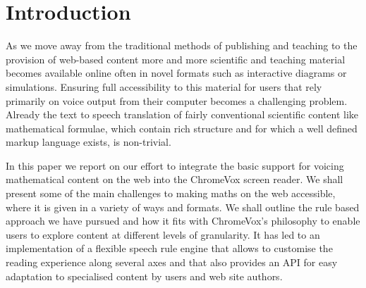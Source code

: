 \documentclass{sig-alternate}
\begin{document}
\terms{}

\keywords{}

\section{Introduction}\label{sec:intro}
As we move away from the traditional methods of publishing and
teaching to the provision of web-based content more and more
scientific and teaching material becomes available online often in
novel formats such as interactive diagrams or simulations. Ensuring
full accessibility to this material for users that rely primarily on
voice output from their computer becomes a challenging
problem. Already the text to speech translation of fairly conventional
scientific content like mathematical formulae, which contain rich
structure and for which a well defined markup language exists, is
non-trivial.


In this paper we report on our effort to integrate the basic support
for voicing mathematical content on the web into the ChromeVox screen
reader. We shall present some of the main challenges to making maths
on the web accessible, where it is given in a variety of ways and
formats. We shall outline the rule based approach we have pursued and
how it fits with ChromeVox's philosophy to enable users to explore
content at different levels of granularity. It has led to an
implementation of a flexible speech rule engine that allows to
customise the reading experience along several axes and that also
provides an API for easy adaptation to specialised content by users
and web site authors.


  
\end{document}
